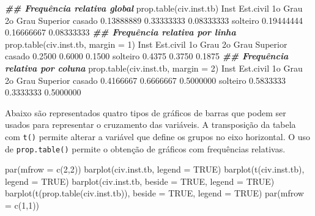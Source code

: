 \documentclass[
  10pt,
  a4paper]{book}
\newenvironment{Shaded}{\begin{snugshade}}{\end{snugshade}}
\newcommand{\AttributeTok}[1]{\textcolor[rgb]{0.77,0.63,0.00}{#1}}
\newcommand{\ConstantTok}[1]{\textcolor[rgb]{0.00,0.00,0.00}{#1}}
\newcommand{\DecValTok}[1]{\textcolor[rgb]{0.00,0.00,0.81}{#1}}
\newcommand{\DocumentationTok}[1]{\textcolor[rgb]{0.56,0.35,0.01}{\textbf{\textit{#1}}}}
\newcommand{\FloatTok}[1]{\textcolor[rgb]{0.00,0.00,0.81}{#1}}
\newcommand{\FunctionTok}[1]{\textcolor[rgb]{0.00,0.00,0.00}{#1}}
\newcommand{\NormalTok}[1]{#1}
\begin{document}
\begin{Shaded}
\begin{Highlighting}[]
\DocumentationTok{\#\# Frequência relativa global}
\FunctionTok{prop.table}\NormalTok{(civ.inst.tb)}
\NormalTok{          Inst}
\NormalTok{Est.civil     1o Grau    2o Grau   Superior}
\NormalTok{  casado   }\FloatTok{0.13888889} \FloatTok{0.33333333} \FloatTok{0.08333333}
\NormalTok{  solteiro }\FloatTok{0.19444444} \FloatTok{0.16666667} \FloatTok{0.08333333}
\DocumentationTok{\#\# Frequência relativa por linha}
\FunctionTok{prop.table}\NormalTok{(civ.inst.tb, }\AttributeTok{margin =} \DecValTok{1}\NormalTok{)}
\NormalTok{          Inst}
\NormalTok{Est.civil  1o Grau 2o Grau Superior}
\NormalTok{  casado    }\FloatTok{0.2500}  \FloatTok{0.6000}   \FloatTok{0.1500}
\NormalTok{  solteiro  }\FloatTok{0.4375}  \FloatTok{0.3750}   \FloatTok{0.1875}
\DocumentationTok{\#\# Frequência relativa por coluna}
\FunctionTok{prop.table}\NormalTok{(civ.inst.tb, }\AttributeTok{margin =} \DecValTok{2}\NormalTok{)}
\NormalTok{          Inst}
\NormalTok{Est.civil    1o Grau   2o Grau  Superior}
\NormalTok{  casado   }\FloatTok{0.4166667} \FloatTok{0.6666667} \FloatTok{0.5000000}
\NormalTok{  solteiro }\FloatTok{0.5833333} \FloatTok{0.3333333} \FloatTok{0.5000000}
\end{Highlighting}
\end{Shaded}

Abaixo são representados quatro tipos de gráficos de barras que podem
ser usados para representar o cruzamento das variáveis. A transposição
da tabela com \texttt{t()} permite alterar a variável que define os grupos no
eixo horizontal. O uso de \texttt{prop.table()} permite o obtenção de gráficos
com frequências relativas.

\begin{Shaded}
\begin{Highlighting}[]
\FunctionTok{par}\NormalTok{(}\AttributeTok{mfrow =} \FunctionTok{c}\NormalTok{(}\DecValTok{2}\NormalTok{,}\DecValTok{2}\NormalTok{))}
\FunctionTok{barplot}\NormalTok{(civ.inst.tb, }\AttributeTok{legend =} \ConstantTok{TRUE}\NormalTok{)}
\FunctionTok{barplot}\NormalTok{(}\FunctionTok{t}\NormalTok{(civ.inst.tb), }\AttributeTok{legend =} \ConstantTok{TRUE}\NormalTok{)}
\FunctionTok{barplot}\NormalTok{(civ.inst.tb, }\AttributeTok{beside =} \ConstantTok{TRUE}\NormalTok{, }\AttributeTok{legend =} \ConstantTok{TRUE}\NormalTok{)}
\FunctionTok{barplot}\NormalTok{(}\FunctionTok{t}\NormalTok{(}\FunctionTok{prop.table}\NormalTok{(civ.inst.tb)), }\AttributeTok{beside =} \ConstantTok{TRUE}\NormalTok{, }\AttributeTok{legend =} \ConstantTok{TRUE}\NormalTok{)}
\FunctionTok{par}\NormalTok{(}\AttributeTok{mfrow =} \FunctionTok{c}\NormalTok{(}\DecValTok{1}\NormalTok{,}\DecValTok{1}\NormalTok{))}
\end{Highlighting}
\end{Shaded}
\end{document}
